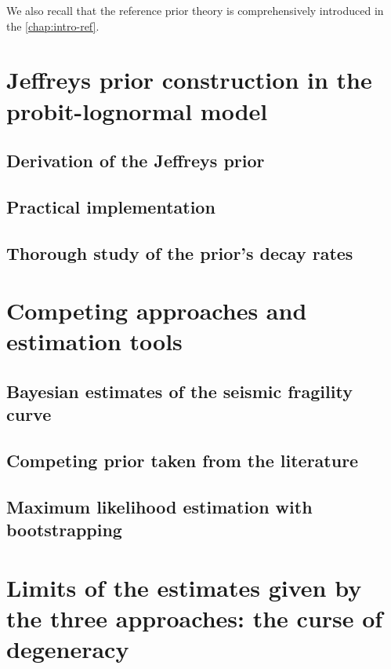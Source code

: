 We also recall that the reference prior theory is comprehensively introduced in the \cref{chap:intro-ref}. 





\section{Jeffreys prior construction in the probit-lognormal model}


    \subsection{Derivation of the Jeffreys prior}


    \subsection{Practical implementation}



    \subsection{Thorough study of the prior's decay rates}




\section{Competing approaches and estimation tools}



    \subsection{Bayesian estimates of the seismic fragility curve}

    \subsection{Competing prior taken from the literature}

    \subsection{Maximum likelihood estimation with bootstrapping}




\section{Limits of the estimates given by the three approaches: the curse of degeneracy}


